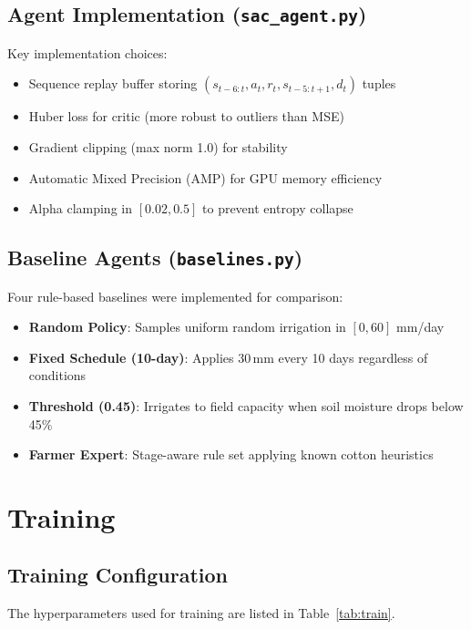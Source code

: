 \documentclass[12pt, a4paper]{article}
\begin{document}
\subsection{Agent Implementation (\texttt{sac\_agent.py})}
Key implementation choices:
\begin{itemize}
    \item Sequence replay buffer storing $(s_{t-6:t}, a_t, r_t, s_{t-5:t+1}, d_t)$ tuples
    \item Huber loss for critic (more robust to outliers than MSE)
    \item Gradient clipping (max norm 1.0) for stability
    \item Automatic Mixed Precision (AMP) for GPU memory efficiency
    \item Alpha clamping in $[0.02, 0.5]$ to prevent entropy collapse
\end{itemize}

\subsection{Baseline Agents (\texttt{baselines.py})}
Four rule-based baselines were implemented for comparison:
\begin{itemize}
    \item \textbf{Random Policy}: Samples uniform random irrigation in $[0, 60]$ mm/day
    \item \textbf{Fixed Schedule (10-day)}: Applies 30\,mm every 10 days regardless of conditions
    \item \textbf{Threshold (0.45)}: Irrigates to field capacity when soil moisture drops below 45\%
    \item \textbf{Farmer Expert}: Stage-aware rule set applying known cotton heuristics
\end{itemize}

\section{Training}

\subsection{Training Configuration}
The hyperparameters used for training are listed in Table~\ref{tab:train}.
\end{document}
